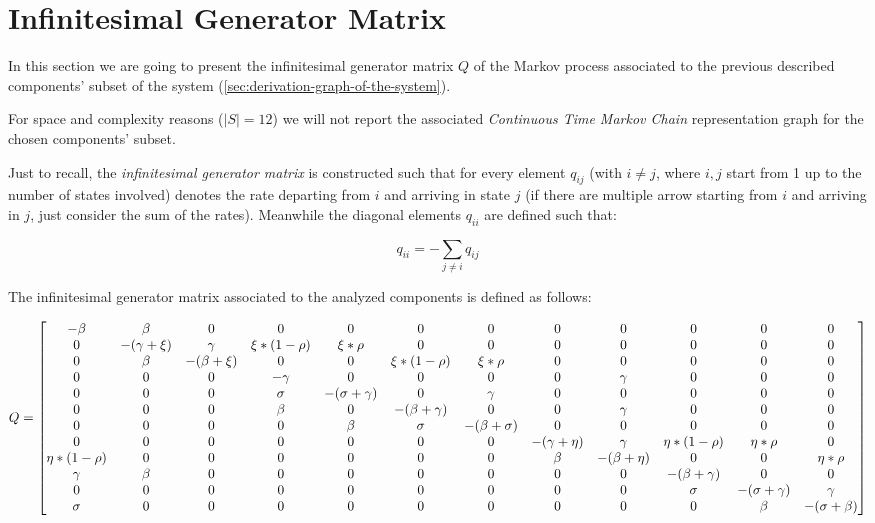 \documentclass{article}
\begin{document}
\section{Infinitesimal Generator Matrix}

In this section we are going to present the infinitesimal generator matrix \(Q\) of the Markov process associated to the previous described components' subset of the system (\autoref{sec:derivation-graph-of-the-system}).\newline

\par\noindent For space and complexity reasons (\(|S| = 12\)) we will not report the associated \textit{Continuous Time Markov Chain} representation graph for the chosen components' subset.\newline

\par\noindent Just to recall, the \textit{infinitesimal generator matrix} is constructed such that for every element \(q_{ij}\) (with \(i \neq j\), where \(i,j\) start from 1 up to the number of states involved) denotes the rate departing from \(i\) and arriving in state \(j\) (if there are multiple arrow starting from \(i\) and arriving in \(j\), just consider the sum of the rates). Meanwhile the diagonal elements \(q_{ii}\) are defined such that:

\[q_{ii} = - \sum_{j \neq i} q_{ij}\]

\noindent The infinitesimal  generator  matrix associated to the analyzed components is defined as follows:

{   
\fontsize{3pt}{8pt}\selectfont 
\[Q =
\setcounter{MaxMatrixCols}{12}
\begin{bmatrix}
    -\beta & \beta & 0 & 0 & 0 & 0 & 0 & 0 & 0 & 0 & 0 & 0 \\
    0 & -(\gamma + \xi) & \gamma & \xi * (1 - \rho) & \xi * \rho & 0 & 0 & 0 & 0 & 0 & 0 & 0 \\
    0 & \beta & -(\beta + \xi) & 0 & 0 & \xi * (1 - \rho) & \xi * \rho & 0 & 0 & 0 & 0 & 0 \\
    0 & 0 & 0 & -\gamma & 0 & 0 & 0 & 0 & \gamma & 0 & 0 & 0 \\
    0 & 0 & 0 & \sigma & -(\sigma + \gamma) & 0 & \gamma & 0 & 0 & 0 & 0 & 0 \\
    0 & 0 & 0 & \beta & 0 & -(\beta + \gamma) & 0 & 0 & \gamma & 0 & 0 & 0 \\
    0 & 0 & 0 & 0 & \beta & \sigma & -(\beta + \sigma) & 0 & 0 & 0 & 0 & 0 \\
    0 & 0 & 0 & 0 & 0 & 0 & 0 & -(\gamma + \eta) & \gamma & \eta * (1 - \rho) & \eta * \rho & 0 \\
    \eta * (1 - \rho) & 0 & 0 & 0 & 0 & 0 & 0 & \beta & -(\beta + \eta) & 0 & 0 & \eta * \rho \\
    \gamma & \beta & 0 & 0 & 0 & 0 & 0 & 0 & 0 & -(\beta + \gamma) & 0 & 0 \\
    0 & 0 & 0 & 0 & 0 & 0 & 0 & 0 & 0 & \sigma & -(\sigma + \gamma) & \gamma \\
    \sigma & 0 & 0 & 0 & 0 & 0 & 0 & 0 & 0 & 0 & \beta & -(\sigma + \beta)
\end{bmatrix}\]
}
\end{document}
